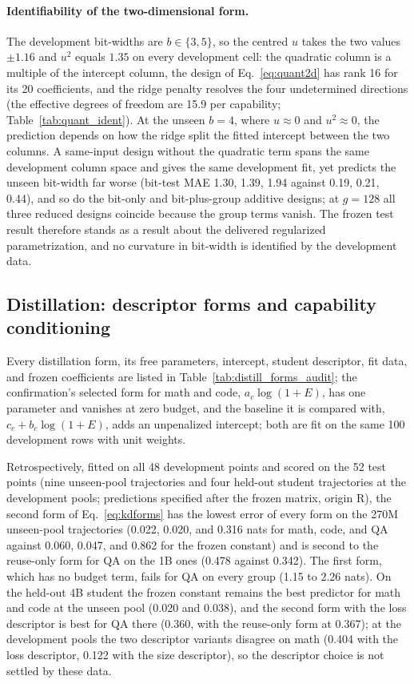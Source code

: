\paragraph{Identifiability of the two-dimensional form.} The
development bit-widths are $b\in\{3,5\}$, so the centred $u$ takes the
two values $\pm1.16$ and $u^2$ equals $1.35$ on every development
cell: the quadratic column is a multiple of the intercept column, the
design of Eq.~\ref{eq:quant2d} has rank 16 for its 20 coefficients,
and the ridge penalty resolves the four undetermined directions (the
effective degrees of freedom are 15.9 per capability;
Table~\ref{tab:quant_ident}). At the unseen $b=4$, where $u\approx0$
and $u^2\approx0$, the prediction depends on how the ridge split the
fitted intercept between the two columns. A same-input design without
the quadratic term spans the same development column space and gives
the same development fit, yet predicts the unseen bit-width far worse
(bit-test MAE 1.30, 1.39, 1.94 against 0.19, 0.21, 0.44), and so do
the bit-only and bit-plus-group additive designs; at $g=128$ all three
reduced designs coincide because the group terms vanish. The frozen
test result therefore stands as a result about the delivered
regularized parametrization, and no curvature in bit-width is
identified by the development data.

\FloatBarrier
\subsection{Distillation: descriptor forms and capability conditioning}


Every distillation form, its free parameters, intercept, student
descriptor, fit data, and frozen coefficients are listed in
Table~\ref{tab:distill_forms_audit}; the confirmation's selected form for math and code,
$a_c\log(1+E)$, has one parameter and vanishes at zero budget, and the
baseline it is compared with, $c_c+b_c\log(1+E)$, adds an unpenalized
intercept; both are fit on the same 100 development rows with unit
weights.


Retrospectively, fitted on all 48 development points and scored on
the 52 test points (nine unseen-pool trajectories and four held-out
student trajectories at the development pools; predictions specified
after the frozen matrix, origin R), the second form of
Eq.~\ref{eq:kdforms} has the lowest error of every form on the 270M
unseen-pool trajectories (0.022, 0.020, and 0.316 nats for math, code,
and QA against 0.060, 0.047, and 0.862 for the frozen constant) and is
second to the reuse-only form for QA on the 1B ones (0.478 against
0.342). The first form, which has no budget term, fails for QA on every
group (1.15 to 2.26 nats). On the held-out 4B student the frozen
constant remains the best predictor for math and code at the unseen
pool (0.020 and 0.038), and the second form with the loss descriptor
is best for QA there (0.360, with the reuse-only form at 0.367); at
the development pools the two descriptor variants disagree on math
(0.404 with the loss descriptor, 0.122 with the size descriptor), so
the descriptor choice is not settled by these data.
\FloatBarrier
